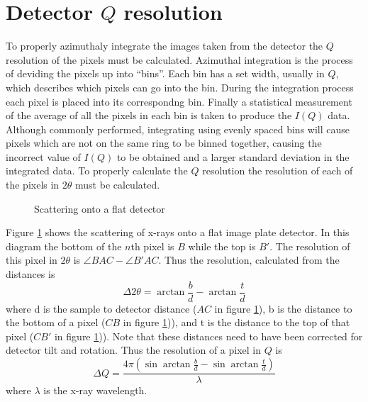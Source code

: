 \section{Detector $Q$ resolution} \label{subsec:qres}
To properly azimuthaly integrate the images taken from the detector the $Q$ resolution of the pixels must be calculated.
Azimuthal integration is the process of deviding the pixels up into ``bins''.
Each bin has a set width, usually in $Q$, which describes which pixels can go into the bin.
During the integration process each pixel is placed into its correspondng bin.
Finally a statistical measurement of the average of all the pixels in each bin is taken to produce the $I(Q)$ data.
Although commonly performed, integrating using evenly spaced bins will cause pixels which are not on the same ring to be binned together, causing the incorrect value of $I(Q)$ to be obtained and a larger standard deviation in the integrated data.
To properly calculate the $Q$ resolution the resolution of each of the pixels in $2\theta$ must be calculated.
\begin{figure}
    \centering
    \caption{Scattering onto a flat detector}
    \label{fig:scattering_digram}
\end{figure}
Figure \ref{fig:scattering_digram} shows the scattering of x-rays onto a flat image plate detector.
In this diagram the bottom of the $n$th pixel is $B$ while the top is $B'$.
The resolution of this pixel in $2\theta$ is $\angle BAC - \angle B'AC$.
Thus the resolution, calculated from the distances is
\begin{equation}
\Delta 2 \theta = \arctan{\frac{b}{d}} - \arctan{\frac{t}{d}}
\end{equation}
where d is the sample to detector distance ($AC$ in figure \ref{fig:scattering_digram}),
b is the distance to the bottom of a pixel ($CB$ in figure \ref{fig:scattering_digram})),
and t is the distance to the top of that pixel ($CB'$ in figure \ref{fig:scattering_digram})).
Note that these distances need to have been corrected for detector tilt and rotation.
Thus the resolution of a pixel in $Q$ is
\begin{equation}
\Delta Q = \frac{4\pi(\sin{\arctan{\frac{b}{d}}} - \sin{\arctan{\frac{t}{d}}})}{\lambda}
\end{equation}
where $\lambda$ is the x-ray wavelength.

